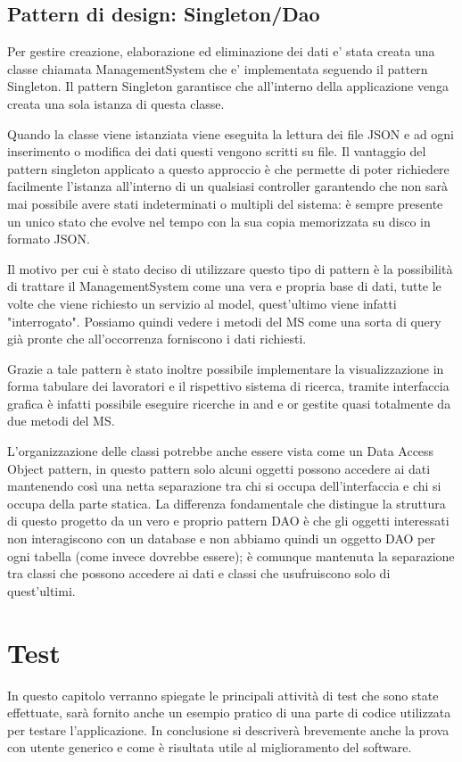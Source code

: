 \documentclass[ 4paper,11pt,openany]{book}
\begin{document}
\section{Pattern di design: Singleton/Dao}
Per gestire creazione, elaborazione ed eliminazione dei dati e' stata creata una classe chiamata ManagementSystem che e' implementata seguendo il pattern Singleton.
Il pattern Singleton garantisce che all'interno della applicazione venga creata una sola istanza di questa classe.

Quando la classe viene istanziata viene eseguita la lettura dei file JSON e ad ogni inserimento o modifica dei dati questi vengono scritti su file.
Il vantaggio del pattern singleton applicato a questo approccio è che permette di poter richiedere facilmente l'istanza all'interno di un qualsiasi controller garantendo che non sarà mai possibile avere stati indeterminati o multipli del sistema: è sempre presente un unico stato che evolve nel tempo con la sua copia memorizzata su disco in formato JSON.

Il motivo per cui è stato deciso di utilizzare questo tipo di pattern è la possibilità di trattare il ManagementSystem come una vera e propria base di dati, tutte le volte che viene richiesto un servizio al model, quest'ultimo viene infatti "interrogato". Possiamo quindi vedere i metodi del MS come una sorta di query già pronte che all'occorrenza forniscono i dati richiesti. 

Grazie a tale pattern è stato inoltre possibile implementare la visualizzazione in forma tabulare dei lavoratori e il rispettivo sistema di ricerca, tramite interfaccia grafica è infatti possibile eseguire ricerche in and e or gestite quasi totalmente da due metodi del MS.

L'organizzazione delle classi potrebbe anche essere vista come un Data Access Object pattern, in questo pattern solo alcuni oggetti possono accedere ai dati mantenendo così una netta separazione tra chi si occupa dell'interfaccia e chi si occupa della parte statica.
La differenza fondamentale che distingue la struttura di questo progetto da un vero e proprio pattern DAO è che gli oggetti interessati non interagiscono con un database e non abbiamo quindi un oggetto DAO per ogni tabella (come invece dovrebbe essere); è comunque mantenuta la separazione tra classi che possono accedere ai dati e classi che usufruiscono solo di quest'ultimi. 

\chapter{Test}
In questo capitolo verranno spiegate le principali attività di test che sono state effettuate, sarà fornito anche un esempio pratico di una parte di codice utilizzata per testare l'applicazione. In conclusione si descriverà brevemente anche la prova con utente generico e come è risultata utile al miglioramento del software. 
\end{document}
